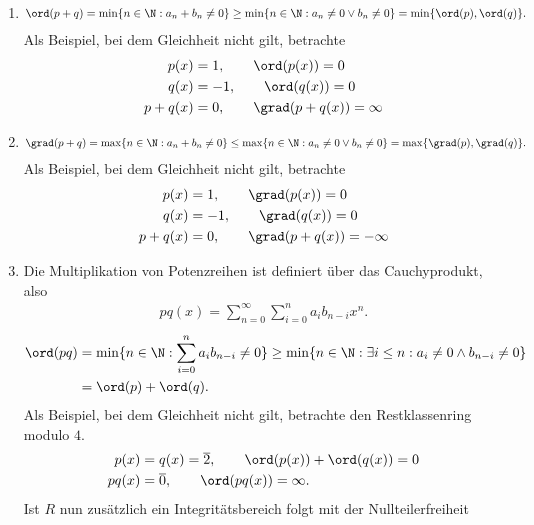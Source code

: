 \begin{solution}
\leavevmode \\
\begin{enumerate}
  \item \begin{align*}
    \ord(p + q) = \min\{n \in \N: a_n + b_n \neq 0\}
    \geq \min\{n \in \N: a_n \neq 0 \lor b_n \neq 0\}
    = \min\{\ord(p),\ord(q)\}.
  \end{align*}
  Als Beispiel, bei dem Gleichheit nicht gilt, betrachte
  \begin{align*}
  p(x) &= 1, \qquad \ord(p(x)) = 0 \\
  q(x) &= -1, \qquad \ord(q(x)) = 0 \\
  p + q (x) &= 0, \qquad \grad(p + q(x)) = \infty
  \end{align*}
  \item \begin{align*}
    \grad(p + q) = \max\{n \in \N: a_n + b_n \neq 0 \}
    \leq \max\{n \in \N: a_n \neq 0 \lor b_n \neq 0 \}
    = \max\{\grad(p),\grad(q)\}.
    \end{align*}
    Als Beispiel, bei dem Gleichheit nicht gilt, betrachte
    \begin{align*}
      p(x) &= 1, \qquad \grad(p(x)) = 0 \\
      q(x) &= -1, \qquad \grad(q(x)) = 0 \\
      p + q (x) &= 0, \qquad \grad(p + q(x)) = -\infty
    \end{align*}
  \item Die Multiplikation von Potenzreihen ist definiert über das Cauchyprodukt, also
  \begin{align*}
    pq(x) = \sum_{n=0}^{\infty}\sum_{i=0}^{n}a_ib_{n-i}x^n.
  \end{align*}
  \begin{align*}
  \ord(pq) &= \min\{n \in \N: \sum_{i=0}^{n}a_ib_{n-i} \neq 0\}
  \geq \min\{n \in \N: \exists i \leq n: a_i \neq 0 \land b_{n-i} \neq 0\} \\
  &= \ord(p) + \ord(q).
  \end{align*}
  Als Beispiel, bei dem Gleichheit nicht gilt, betrachte den Restklassenring modulo $4$.
  \begin{align*}
    p(x) &= q(x) = \overline{2}, \qquad \ord(p(x)) + \ord(q(x)) = 0 \\
    pq(x) &= \overline{0}, \qquad \ord(pq(x)) = \infty.
  \end{align*}
  Ist $R$ nun zusätzlich ein Integritätsbereich folgt mit der Nullteilerfreiheit

\end{enumerate}
\end{solution}
